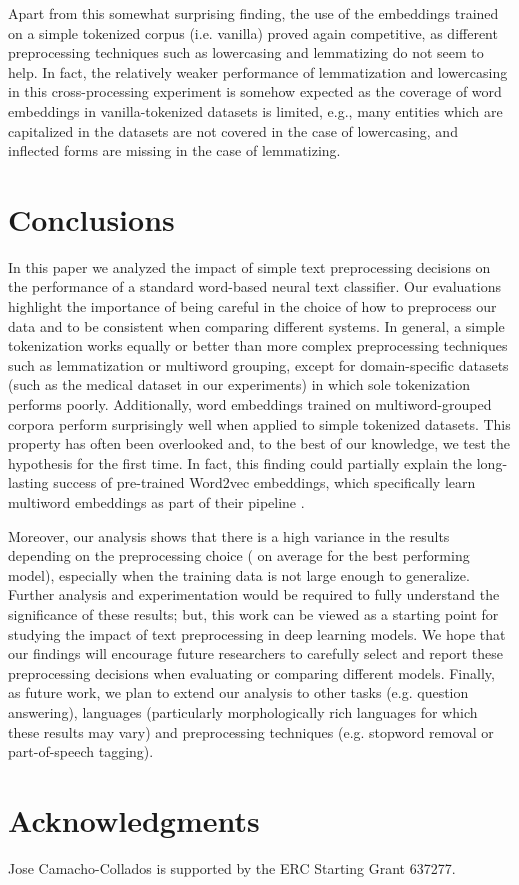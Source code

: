 \documentclass[11pt,a4paper]{article}
\begin{document}
Apart from this somewhat surprising finding, the use of the embeddings trained on a simple tokenized corpus (i.e. vanilla) proved again competitive, as different preprocessing techniques such as lowercasing and lemmatizing do not seem to help. In fact, the relatively weaker performance of lemmatization and lowercasing in this cross-processing experiment is somehow expected as the coverage of word embeddings in vanilla-tokenized datasets is limited, e.g., many entities which are capitalized in the datasets are not covered in the case of lowercasing, and inflected forms are missing in the case of lemmatizing.  






\section{Conclusions}

In this paper we analyzed the impact of simple text preprocessing decisions on the performance of a standard word-based neural text classifier. Our evaluations highlight the importance of being careful in the choice of how to preprocess our data and to be consistent when comparing different systems. In general, a simple tokenization works equally or better than more complex preprocessing techniques such as lemmatization or multiword grouping, except for domain-specific datasets (such as the medical dataset in our experiments) in which sole tokenization performs poorly. Additionally, word embeddings trained on multiword-grouped corpora perform surprisingly well when applied to simple tokenized datasets. This property has often been overlooked and, to the best of our knowledge, we test the hypothesis for the first time. 
In fact, this finding could partially explain the long-lasting success of pre-trained Word2vec embeddings, which specifically learn multiword embeddings as part of their pipeline \cite{mikolov2013distributed}. 

Moreover, our analysis shows that there is a high variance in the results depending on the preprocessing choice ( on average for the best performing model), especially when the training data is not large enough to generalize. Further analysis and experimentation would be required to fully understand the significance of these results; but, this work can be viewed as a starting point for studying the impact of text preprocessing in deep learning models. We hope that our findings will encourage future researchers to carefully select and report these preprocessing decisions when evaluating or comparing different models. Finally, as future work, we plan to extend our analysis to other tasks (e.g. question answering), languages (particularly morphologically rich languages for which these results may vary) and preprocessing techniques (e.g. stopword removal or part-of-speech tagging). 





\section*{Acknowledgments}

Jose Camacho-Collados is supported by the ERC Starting Grant 637277.










\appendix
\end{document}
